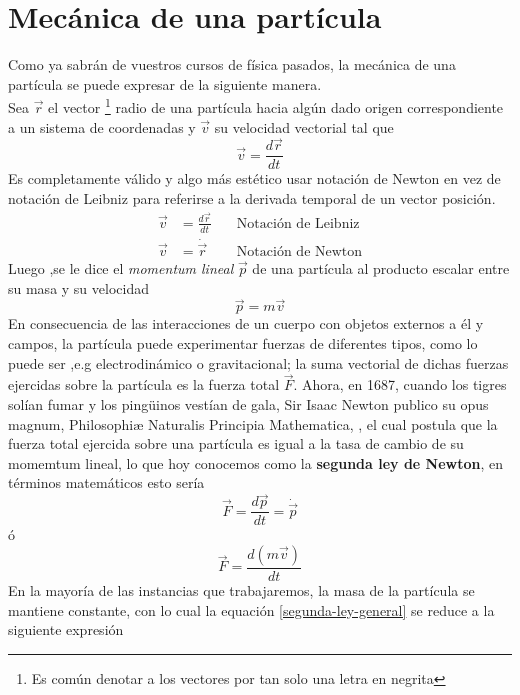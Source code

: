 \documentclass[../main.tex]{subfiles}
\begin{document}
\section{Mecánica de una partícula}
Como ya sabrán de vuestros cursos de física pasados, la mecánica de una partícula se puede expresar de la siguiente manera. \\
Sea $\vec{r}$  el vector \footnote{Es común denotar a los vectores por tan solo una letra en negrita} radio de una partícula hacia algún dado origen correspondiente a un sistema de coordenadas y $\vec{v}$ su velocidad vectorial tal que
\begin{equation}
    \vec{v}=\frac{d\vec{r}}{dt}
\end{equation}
Es completamente válido y algo más estético usar notación de Newton en vez de notación de Leibniz para referirse a la derivada temporal de un vector posición.
\begin{align*}
    \vec{v} & =\frac{d\vec{r}}{dt}  \quad & \text{Notación de Leibniz} \\
    \vec{v} & = \dot{\vec{r}} \quad & \text{Notación de Newton}
\end{align*}
Luego ,se le dice el \emph{momentum lineal} $\vec{p}$ de una partícula al producto escalar entre su masa y su velocidad
\begin{equation}
    \vec{p}=m\vec{v}
\end{equation}
En consecuencia de las interacciones de un cuerpo con objetos externos a él y campos, la partícula puede experimentar fuerzas de diferentes tipos, como lo puede ser ,e.g electrodinámico o gravitacional; la suma vectorial de dichas fuerzas ejercidas sobre la partícula es la fuerza total $\vec{F}$. Ahora, en 1687, cuando los tigres solían fumar y los pingüinos vestían de gala, Sir Isaac Newton publico su opus magnum, Philosophiæ Naturalis Principia Mathematica, \cite{newton1687principia}, el cual postula que la fuerza total ejercida sobre una partícula es igual a la tasa de cambio de su momemtum lineal, lo que hoy conocemos como la \textbf{segunda ley de Newton}, en términos matemáticos esto sería
\begin{equation}
    \boxed{\vec{F}=\frac{d \vec{p}}{dt}=\dot{\vec{p}}}
\end{equation}
ó
\begin{equation} \label{segunda-ley-general}
    \vec{F}=\frac{d(m\vec{v})}{dt}
\end{equation}
En la mayoría de las instancias que trabajaremos, la masa de la partícula se mantiene constante, con lo cual la equación \eqref{segunda-ley-general} se reduce a la siguiente expresión
\end{document}
